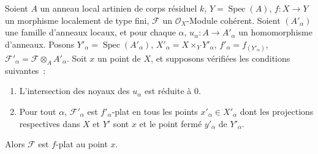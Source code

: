 \begin{proposition}[11.4.12]
\label{IV.11.4.12-fr}
Soient $A$ un anneau local artinien de corps résiduel $k$,
$Y=\operatorname{Spec}(A)$, $f:X\to Y$ un morphisme localement de type fini,
$\mathcal F$ un $\mathcal O_X$-Module cohérent. Soient $(A'_\alpha)$ une famille
d'anneaux locaux, et pour chaque $\alpha$, $u_\alpha:A\to A'_\alpha$ un
homomorphisme d'anneaux. Posons $Y'_\alpha=\operatorname{Spec}(A'_\alpha)$,
$X'_\alpha=X\times_Y Y'_\alpha$, $f'_\alpha=f_{(Y'_\alpha)}$,
$\mathcal F'_\alpha=\mathcal F\otimes_A A'_\alpha$. Soit $x$ un point de $X$,
et supposons vérifiées les conditions suivantes~:
\begin{enumerate}[label=\textup{(\roman*)}]
  \item L'intersection des noyaux des $u_\alpha$ est réduite à $0$.
  \item Pour tout $\alpha$, $\mathcal F'_\alpha$ est $f'_\alpha$-plat en \textup{tous}
  les points $x'_\alpha\in X'_\alpha$ dont les projections respectives dans
  $X$ et $Y'$ sont $x$ et le point fermé $y'_\alpha$ de $Y'_\alpha$.
\end{enumerate}

Alors $\mathcal F$ est $f$-plat au point $x$.
\end{proposition}


